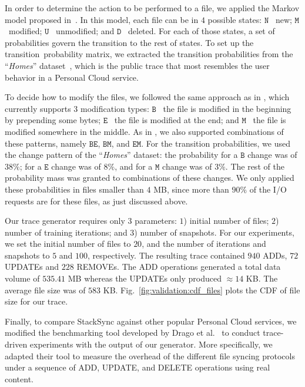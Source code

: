 In order to determine the action to be performed to a file, we applied the Markov model proposed in~\cite{Tarasov12}. 
In this model, each file can be in $4$ possible states: $\mathtt{N}$ \textemdash~new; $\mathtt{M} $\textemdash~modified; 
$\mathtt{U}$ \textemdash~unmodified; and $\mathtt{D}$ \textemdash~deleted.
For each of those states, a set of probabilities govern the transition to the rest of states.
To set up the transition~probability
matrix, we extracted the transition probabilities from the ``\textit{Homes}'' dataset~\cite{Tarasov12}, 
which is the public trace that most resembles the user behavior in a Personal Cloud service.

To decide how to modify the files, we followed the same approach as in \cite{Tarasov12},
which currently supports $3$ modification types: $\mathtt{B}$ \textemdash~the file is modified in the
beginning by prepending some bytes; $\mathtt{E}$ \textemdash~the file is modified at the end; and $\mathtt{M}$ \textemdash~the
file is modified somewhere in the middle.  As in \cite{Tarasov12}, we also supported
combinations of these patterns, namely $\mathtt{BE}$, $\mathtt{BM}$, and $\mathtt{EM}$. For the transition 
probabilities, we used the change pattern of the ``\textit{Homes}'' dataset: the probability for a $\mathtt{B}$ 
change was of $38\%$; for a $\mathtt{E}$ change was of $8\%$, and for a $\mathtt{M}$ change was of $3\%$. 
The rest of the probability mass was granted to combinations of these changes. We only applied these probabilities
in files smaller than $4$ MB, since more than $90\%$ of the I/O requests are for these files, as just
discussed above.

Our trace generator requires only $3$ parameters: $1$) initial number of files; $2$) number
of training iterations; and $3$) number of snapshots. For our experiments, we set the
initial number of files to $20$, and the number of iterations and snapshots to $5$ and
$100$, respectively. The resulting trace contained $940$ ADDs, $72$ UPDATEs and $228$ REMOVEs.
The ADD operations generated a total data volume of $535.41$ MB whereas the UPDATEs only produced
$\approx 14$ KB. The average file size was of $583$ KB. Fig.~\ref{fig:validation:cdf_files} plots
the CDF of file size for our trace.

Finally, to compare StackSync against other popular Personal Cloud services,
we modified the benchmarking tool developed by Drago et al.~\cite{drago2013benchmarking} to
conduct trace-driven experiments with the output of our generator. More specifically, we adapted
their tool to measure the overhead of the different file syncing protocols under a sequence of
ADD, UPDATE, and DELETE operations using real content.


